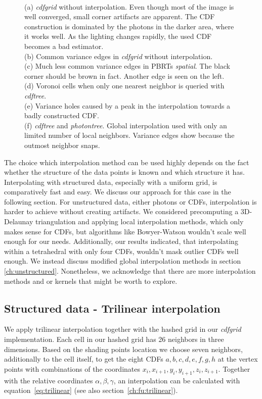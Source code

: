 \begin{figure}
{    \\(a) \textit{cdfgrid} without interpolation. Even though most of the image is well converged, small corner artifacts are apparent. The CDF construction is dominated by the photons in the darker area, where it works well. As the lighting changes rapidly, the used CDF becomes a bad estimator. 
    \\(b) Common variance edges in \textit{cdfgrid} without interpolation. 
    \\(c) Much less common variance edges in PBRTs \textit{spatial}. The black corner should be brown in fact. Another edge is seen on the left. 
    \\(d) Voronoi cells when only one nearest neighbor is queried with \textit{cdftree}. 
    \\(e) Variance holes caused by a peak in the interpolation towards a badly constructed CDF.
    \\(f) \textit{cdftree} and \textit{photontree}. Global interpolation used with only an limited number of local neighbors. Variance edges show because the outmost neighbor snaps.
    }
\end{figure}


The choice which interpolation method can be used highly depends on the fact whether the structure of the data points is known and which structure it has. Interpolating with structured data, especially with a uniform grid, is comparatively fast and easy. We discuss our approach for this case in the following section. For unstructured data, either photons or CDFs, interpolation is harder to achieve without creating artifacts. We considered precomputing a 3D-Delaunay triangulation and applying local interpolation methods, which only makes sense for CDFs, but algorithms like Bowyer-Watson wouldn't scale well enough for our needs. Additionally, our results indicated, that interpolating within a tetrahedral with only four CDFs, wouldn't mask outlier CDFs well enough. We instead discuss modified global interpolation methods in section \ref{ch:unstructured}. Nonetheless, we acknowledge that there are more interpolation methods and or kernels that might be worth to explore.

\subsection{Structured data - Trilinear interpolation}
\label{ch:trilinear}

We apply trilinear interpolation together with the hashed grid in our \textit{cdfgrid} implementation. Each cell in our hashed grid has 26 neighbors in three dimensions. Based on the shading points location we choose seven neighbors, additionally to the cell itself, to get the eight CDFs $a,b,c,d,e,f,g,h$ at the vertex points with combinations of the coordinates $x_i, x_{i+1}, y_i, y_{i+1}, z_i, z_{i+1}$. Together with the relative coordinates $\alpha, \beta, \gamma$, an interpolation can be calculated with equation~\ref{eq:trilinear} (see also section~\ref{ch:fu:trilinear}).

